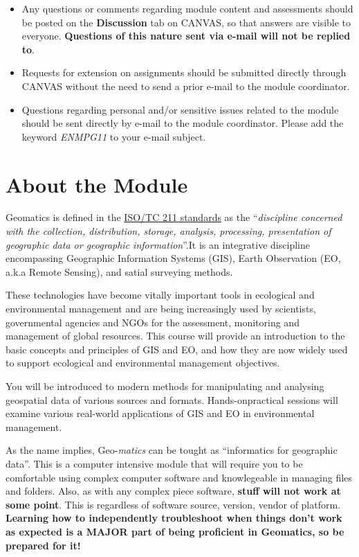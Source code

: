 \documentclass[
]{book}
\let\BeginKnitrBlock\begin \let\EndKnitrBlock\end
\begin{document}
\begin{itemize}
\item
  Any questions or comments regarding module content and assessments should be posted on the \textbf{Discussion} tab on CANVAS, so that answers are visible to everyone. \textbf{Questions of this nature sent via e-mail will not be replied to}.
\item
  Requests for extension on assignments should be submitted directly through CANVAS without the need to send a prior e-mail to the module coordinator.
\item
  Questions regarding personal and/or sensitive issues related to the module should be sent directly by e-mail to the module coordinator. Please add the keyword \emph{ENMPG11} to your e-mail subject.
\end{itemize}

\hypertarget{about-the-module}{%
\section{About the Module}\label{about-the-module}}

Geomatics is defined in the \href{https://www.iso.org/obp/ui/\#iso:std:iso:tr:19122:ed-1:v1:en}{ISO/TC 211 standards} as the ``\emph{discipline concerned with the collection, distribution, storage, analysis, processing, presentation of geographic data or geographic information}''.It is an integrative discipline encompassing Geographic Information Systems (GIS), Earth Observation (EO, a.k.a Remote Sensing), and satial surveying methods.

These technologies have become vitally important tools in ecological and environmental management and are being increasingly used by scientists, governmental agencies and NGOs for the assessment, monitoring and management of global resources. This course will provide an introduction to the basic concepts and principles of GIS and EO, and how they are now widely used to support ecological and environmental management objectives.

You will be introduced to modern methods for manipulating and analysing geospatial data of various sources and formats. Hands-onpractical sessions will examine various real-world applications of GIS and EO in environmental management.

\BeginKnitrBlock{rmdimportant}
As the name implies, Geo-\emph{matics} can be tought as ``informatics for geographic data''. This is a computer intensive module that will require you to be comfortable using complex computer software and knowlegeable in managing files and folders. Also, as with any complex piece software, \textbf{stuff will not work at some point}. This is regardless of software source, version, vendor of platform. \textbf{Learning how to independently troubleshoot when things don't work as expected is a MAJOR part of being proficient in Geomatics, so be prepared for it!}
\EndKnitrBlock{rmdimportant}
\end{document}
